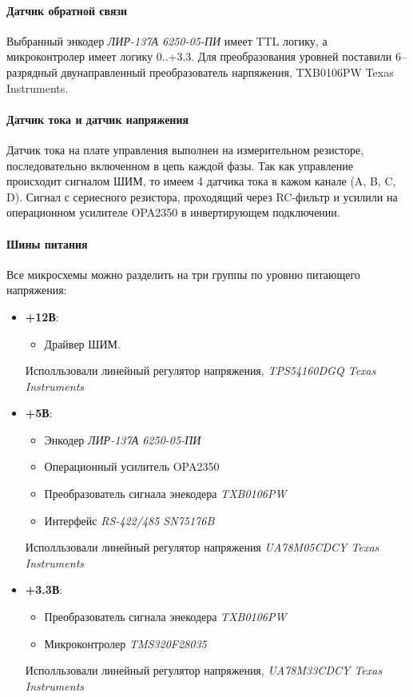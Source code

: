\paragraph{Датчик обратной связи}
Выбранный энкодер \textit{ЛИР-137А 6250-05-ПИ} имеет TTL логику, а
микроконтролер имеет логику 0..+3.3. Для преобразования уровней поставили
6--разрядный двунаправленный преобразователь нарпяжения,
TXB0106PW Texas Instruments.

\paragraph{Датчик тока и датчик напряжения}
Датчик тока на плате управления выполнен на измерительном резисторе,
последовательно включенном в цепь каждой фазы. Так как управление происходит
сигналом ШИМ, то имеем 4 датчика тока в кажом канале (A, B, C, D).
Сигнал с сериесного резистора, проходящий через RC-фильтр и усилили на
операционном усилителе OPA2350 в инвертирующем подключении.

\paragraph{Шины питания}
Все микросхемы можно разделить на три группы по уровню питающего напряжения:
\begin{itemize}
    \item \textbf{+12В}:
        \begin{itemize}
            \item Драйвер ШИМ.
        \end{itemize}
        Исполльзовали линейный регулятор напряжения,
        \textit{TPS54160DGQ Texas Instruments}
    \item \textbf{+5В}:
        \begin{itemize}
            \item Энкодер \textit{ЛИР-137А 6250-05-ПИ}
            \item Операционный усилитель OPA2350
            \item Преобразователь сигнала энекодера \textit{TXB0106PW}
            \item Интерфейс \textit{RS-422/485 SN75176B}
        \end{itemize}
        Исполльзовали линейный регулятор напряжения
        \textit{UA78M05CDCY Texas Instruments}
    \item \textbf{+3.3В}:
        \begin{itemize}
            \item Преобразователь сигнала энекодера \textit{TXB0106PW}
            \item Микроконтролер \textit{TMS320F28035}
        \end{itemize}
        Исполльзовали линейный регулятор напряжения,
        \textit{UA78M33CDCY Texas Instruments}
\end{itemize}

